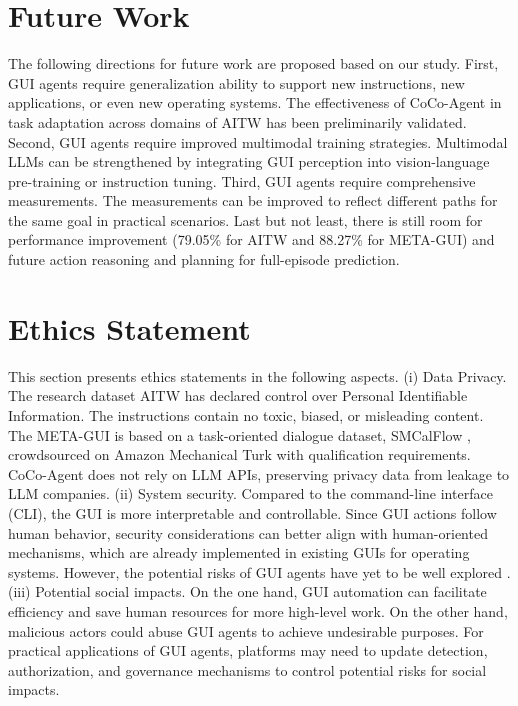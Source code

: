 \section*{Future Work}
The following directions for future work are proposed based on our study.
First, GUI agents require generalization ability to support new instructions, new applications, or even new operating systems. The effectiveness of CoCo-Agent in task adaptation across domains of AITW has been preliminarily validated.
Second, GUI agents require improved multimodal training strategies. Multimodal LLMs can be strengthened by integrating GUI perception into vision-language pre-training or instruction tuning.
Third, GUI agents require comprehensive measurements. The measurements can be improved to reflect different paths for the same goal in practical scenarios.
Last but not least, there is still room for performance improvement (79.05\% for AITW and 88.27\% for META-GUI) and future action reasoning and planning for full-episode prediction.

\section*{Ethics Statement}
This section presents ethics statements in the following aspects.
(i) Data Privacy. The research dataset AITW \cite{rawles2023android} has declared control over Personal Identifiable Information. The instructions contain no toxic, biased, or misleading content. The META-GUI is based on a task-oriented dialogue dataset, SMCalFlow \cite{andreas-etal-2020-task}, crowdsourced on Amazon Mechanical Turk with qualification requirements.  CoCo-Agent does not rely on LLM APIs, preserving privacy data from leakage to LLM companies.
(ii) System security. Compared to the command-line interface (CLI), the GUI is more interpretable and controllable. Since GUI actions follow human behavior, security considerations can better align with human-oriented mechanisms, which are already implemented in existing GUIs for operating systems. However, the potential risks of GUI agents have yet to be well explored \cite{yuan2024rjudge, Yang2024WatchOF}.
(iii) Potential social impacts. On the one hand, GUI automation can facilitate efficiency and save human resources for more high-level work. On the other hand, malicious actors could abuse GUI agents to achieve undesirable purposes. For practical applications of GUI agents, platforms may need to update detection, authorization, and governance mechanisms to control potential risks for social impacts.


